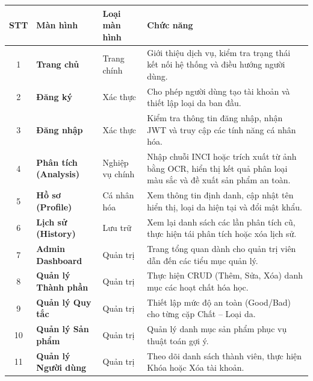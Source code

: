 \documentclass[12pt,a4paper]{article}
\begin{document}
\begin{center}
\renewcommand{\arraystretch}{1.5}
\begin{tabularx}{\textwidth}{|c|l|l|X|}
\hline
\rowcolor{blue!20}
\textbf{STT} & \textbf{Màn hình} & \textbf{Loại màn hình} & \textbf{Chức năng} \\ \hline

1 & \textbf{Trang chủ} & Trang chính & Giới thiệu dịch vụ, kiểm tra trạng thái kết nối hệ thống và điều hướng người dùng. \\ \hline

2 & \textbf{Đăng ký} & Xác thực & Cho phép người dùng tạo tài khoản và thiết lập loại da ban đầu. \\ \hline

3 & \textbf{Đăng nhập} & Xác thực & Kiểm tra thông tin đăng nhập, nhận JWT và truy cập các tính năng cá nhân hóa. \\ \hline

4 & \textbf{Phân tích (Analysis)} & Nghiệp vụ chính & Nhập chuỗi INCI hoặc trích xuất từ ảnh bằng OCR, hiển thị kết quả phân loại màu sắc và đề xuất sản phẩm an toàn. \\ \hline

5 & \textbf{Hồ sơ (Profile)} & Cá nhân hóa & Xem thông tin định danh, cập nhật tên hiển thị, loại da hiện tại và đổi mật khẩu. \\ \hline

6 & \textbf{Lịch sử (History)} & Lưu trữ & Xem lại danh sách các lần phân tích cũ, thực hiện tái phân tích hoặc xóa lịch sử. \\ \hline

7 & \textbf{Admin Dashboard} & Quản trị & Trang tổng quan dành cho quản trị viên dẫn đến các tiểu mục quản lý. \\ \hline

8 & \textbf{Quản lý Thành phần} & Quản trị & Thực hiện CRUD (Thêm, Sửa, Xóa) danh mục các hoạt chất hóa học. \\ \hline

9 & \textbf{Quản lý Quy tắc} & Quản trị & Thiết lập mức độ an toàn (Good/Bad) cho từng cặp Chất -- Loại da. \\ \hline

10 & \textbf{Quản lý Sản phẩm} & Quản trị & Quản lý danh mục sản phẩm phục vụ thuật toán gợi ý. \\ \hline

11 & \textbf{Quản lý Người dùng} & Quản trị & Theo dõi danh sách thành viên, thực hiện Khóa hoặc Xóa tài khoản. \\ \hline


\end{tabularx}
\end{center}
\end{document}
